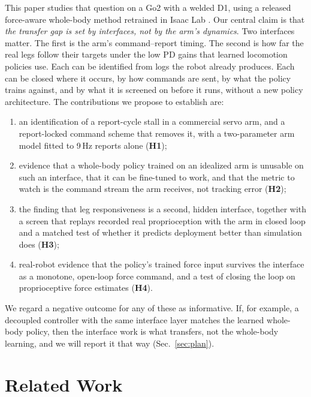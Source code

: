 \documentclass[conference]{IEEEtran}
\newcommand{\hyp}[1]{\textbf{H#1}}
\begin{document}
This paper studies that question on a Go2 with a welded D1, using a released force-aware whole-body method
\citep{zhi2025unified} retrained in Isaac Lab \citep{mittal2023orbit}. Our central claim is that \emph{the transfer gap is set by
interfaces, not by the arm's dynamics}. Two interfaces matter. The first is the arm's command--report timing. The second
is how far the real legs follow their targets under the low PD gains that learned locomotion policies use. Each can be
identified from logs the robot already produces. Each can be closed where it occurs, by how commands are sent, by what
the policy trains against, and by what it is screened on before it runs, without a new policy architecture. The
contributions we propose to establish are:
\begin{enumerate}
\item an identification of a report-cycle stall in a commercial servo arm, and a report-locked command scheme that
removes it, with a two-parameter arm model fitted to 9\,Hz reports alone (\hyp{1});
\item evidence that a whole-body policy trained on an idealized arm is unusable on such an interface, that it can be
fine-tuned to work, and that the metric to watch is the command stream the arm receives, not tracking error (\hyp{2});
\item the finding that leg responsiveness is a second, hidden interface, together with a screen that replays recorded
real proprioception with the arm in closed loop and a matched test of whether it predicts deployment better than
simulation does (\hyp{3});
\item real-robot evidence that the policy's trained force input survives the interface as a monotone, open-loop force
command, and a test of closing the loop on proprioceptive force estimates (\hyp{4}).
\end{enumerate}
We regard a negative outcome for any of these as informative. If, for example, a decoupled controller with the same
interface layer matches the learned whole-body policy, then the interface work is what transfers, not the whole-body
learning, and we will report it that way (Sec.~\ref{sec:plan}).

\section{Related Work}
\end{document}
